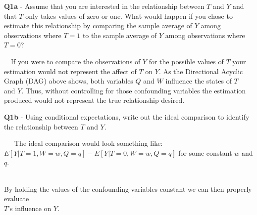 \documentclass[
]{article}
\begin{document}
\textbf{Q1a} - Assume that you are interested in the relationship
between \(T\) and \(Y\) and that \(T\) only takes values of zero or one.
What would happen if you chose to estimate this relationship by
comparing the sample average of \(Y\) among observations where \(T=1\)
to the sample average of \(Y\) among observations where \(T=0\)?

\hfill\break
~~If you were to compare the observations of \(Y\) for the possible
values of \(T\) your\\
\hspace*{0.333em}\hspace*{0.333em}estimation would not represent the
affect of \(T\) on \(Y\). As the Directional Acyclic\\
\hspace*{0.333em}\hspace*{0.333em}Graph (DAG) above shows, both
variables \(Q\) and \(W\) influence the states of \(T\)\\
\hspace*{0.333em}\hspace*{0.333em}and \(Y\). Thus, without controlling
for those confounding variables the estimation\\
\hspace*{0.333em}\hspace*{0.333em}produced would not represent the true
relationship desired.

\hfill\break
\hfill\break

\textbf{Q1b} - Using conditional expectations, write out the ideal
comparison to identify the relationship between \(T\) and \(Y\).

\hfill\break
~~~The ideal comparison would look something like:\\
\hspace*{0.333em}\hspace*{0.333em}\hspace*{0.333em}\(E[Y|T=1,W=w,Q=q] - E[Y|T=0,W=w,Q=q]\)
for some constant \(w\) and \(q\).\\
\strut \\
\hspace*{0.333em}\hspace*{0.333em}\hspace*{0.333em}By holding the values
of the confounding variables constant we can then properly evaluate\\
\hspace*{0.333em}\hspace*{0.333em}\hspace*{0.333em}\(T\)'s influence on
\(Y\).
\end{document}
